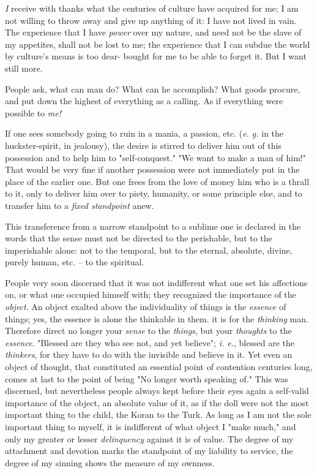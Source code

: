 \textit{I} receive with thanks what the centuries of culture have acquired for 
me; I am not willing to throw away and give up anything of it: I have not 
lived in vain. The experience that I have \textit{power} over my nature, and 
need not be the slave of my appetites, shall not be lost to me; the experience 
that I can subdue the world by culture's means is too dear- bought for me to 
be able to forget it. But I want still more.

People ask, what can man do? What can he accomplish? What goods procure, and 
put down the highest of everything as a calling. As if everything were 
possible to \textit{me!}

If one sees somebody going to ruin in a mania, a passion, etc. (\textit{e. g.} 
in the huckster-spirit, in jealousy), the desire is stirred to deliver him out 
of this possession and to help him to "{}self-conquest."{} "{}We want to make 
a man of him!"{} That would be very fine if another possession were not 
immediately put in the place of the earlier one. But one frees from the love 
of money him who is a thrall to it, only to deliver him over to piety, 
humanity, or some principle else, and to transfer him to a \textit{fixed 
standpoint} anew.

This transference from a narrow standpoint to a sublime one is declared in the 
words that the sense must not be directed to the perishable, but to the 
imperishable alone: not to the temporal, but to the eternal, absolute, divine, 
purely human, etc. -- to the spiritual.

People very soon discerned that it was not indifferent what one set his 
affections on, or what one occupied himself with; they recognized the 
importance of the \textit{object}. An object exalted above the individuality 
of things is the \textit{essence} of things; yes, the essence is alone the 
thinkable in them. it is for the \textit{thinking} man. Therefore direct no 
longer your \textit{sense} to the \textit{things}, but your \textit{thoughts} 
to the \textit{essence}. "{}Blessed are they who see not, and yet believe"{}; 
\textit{i. e.}, blessed are the \textit{thinkers}, for they have to do with 
the invisible and believe in it. Yet even an object of thought, that 
constituted an essential point of contention centuries long, comes at last to 
the point of being "{}No longer worth speaking of."{} This was discerned, but 
nevertheless people always kept before their eyes again a self-valid 
importance of the object, an absolute value of it, as if the doll were not the 
most important thing to the child, the Koran to the Turk. As long as I am not 
the sole important thing to myself, it is indifferent of what object I "{}make 
much,"{} and only my greater or lesser \textit{delinquency} against it is of 
value. The degree of my attachment and devotion marks the standpoint of my 
liability to service, the degree of my sinning shows the measure of my 
ownness.

